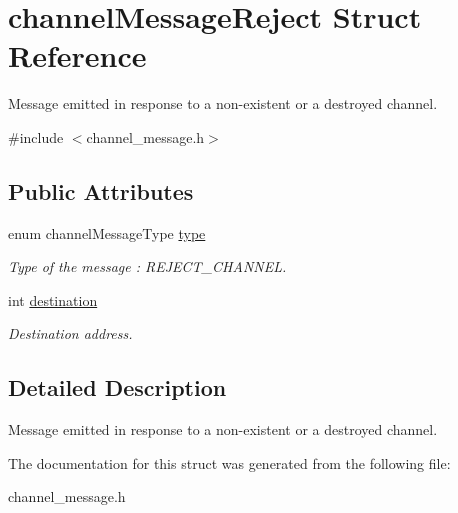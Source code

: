 \hypertarget{structchannelMessageReject}{\section{channel\-Message\-Reject Struct Reference}
\label{structchannelMessageReject}
}


Message emitted in response to a non-\/existent or a destroyed channel.  




{\ttfamily \#include $<$channel\-\_\-message.\-h$>$}

\subsection*{Public Attributes}
\begin{DoxyCompactItemize}
\item 
\hypertarget{structchannelMessageReject_a9d67abef573ef8aaa652e58ffd25709c}{enum channel\-Message\-Type \hyperlink{structchannelMessageReject_a9d67abef573ef8aaa652e58ffd25709c}{type}}\label{structchannelMessageReject_a9d67abef573ef8aaa652e58ffd25709c}

\begin{DoxyCompactList}\small\item\em Type of the message \-: R\-E\-J\-E\-C\-T\-\_\-\-C\-H\-A\-N\-N\-E\-L. \end{DoxyCompactList}\item 
\hypertarget{structchannelMessageReject_a4ea33397b6530cc1d5f6a037a9690c58}{int \hyperlink{structchannelMessageReject_a4ea33397b6530cc1d5f6a037a9690c58}{destination}}\label{structchannelMessageReject_a4ea33397b6530cc1d5f6a037a9690c58}

\begin{DoxyCompactList}\small\item\em Destination address. \end{DoxyCompactList}\end{DoxyCompactItemize}


\subsection{Detailed Description}
Message emitted in response to a non-\/existent or a destroyed channel. 

The documentation for this struct was generated from the following file\-:\begin{DoxyCompactItemize}
\item 
channel\-\_\-message.\-h\end{DoxyCompactItemize}

